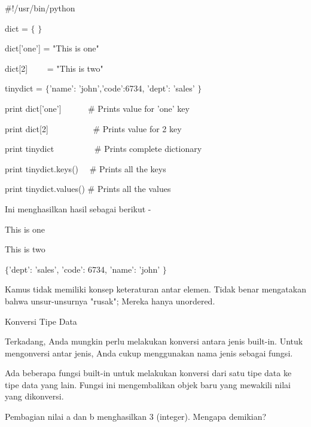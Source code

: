 \noindent 
 $  \#  $!/usr/bin/python \par
\vspace{12pt}
\noindent 
dict =  $  \{  $ $  \}  $ \par
\noindent 
dict['one'] = "This is one" \par
\noindent 
dict[2]~~~~ = "This is two" \par
\vspace{12pt}
\noindent 
tinydict =  $  \{  $'name': 'john','code':6734, 'dept': 'sales' $  \}  $ \par
\vspace{12pt}
\vspace{12pt}
\noindent 
print dict['one']~~ ~~~  $  \#  $ Prints value for 'one' key \par
\noindent 
print dict[2]~~~~~~~~~~  $  \#  $ Prints value for 2 key \par
\noindent 
print tinydict~~~~~~~~~  $  \#  $ Prints complete dictionary \par
\noindent 
print tinydict.keys()~~  $  \#  $ Prints all the keys \par
\noindent 
print tinydict.values()  $  \#  $ Prints all the values \par
\noindent 
Ini menghasilkan hasil sebagai berikut - \par
\noindent 
This is one \par
\noindent 
This is two \par
\noindent 
 $  \{  $'dept': 'sales', 'code': 6734, 'name': 'john' $  \}  $ \par
{} \par
{} \par
\noindent 
Kamus tidak memiliki konsep keteraturan antar elemen. $  $Tidak benar mengatakan bahwa unsur-unsurnya "rusak"; $  $Mereka hanya unordered. \par
\noindent 
Konversi Tipe Data \par
\noindent 
Terkadang, Anda mungkin perlu melakukan konversi antara jenis built-in. $  $Untuk mengonversi antar jenis, Anda cukup menggunakan nama jenis sebagai fungsi. \par
\noindent 
Ada beberapa fungsi built-in untuk melakukan konversi dari satu tipe data ke tipe data yang lain. $  $Fungsi ini mengembalikan objek baru yang mewakili nilai yang dikonversi. \par
\noindent 
Pembagian nilai $  $a $  $dan $  $b $  $menghasilkan $  $3 $  $(integer). Mengapa demikian? \par
